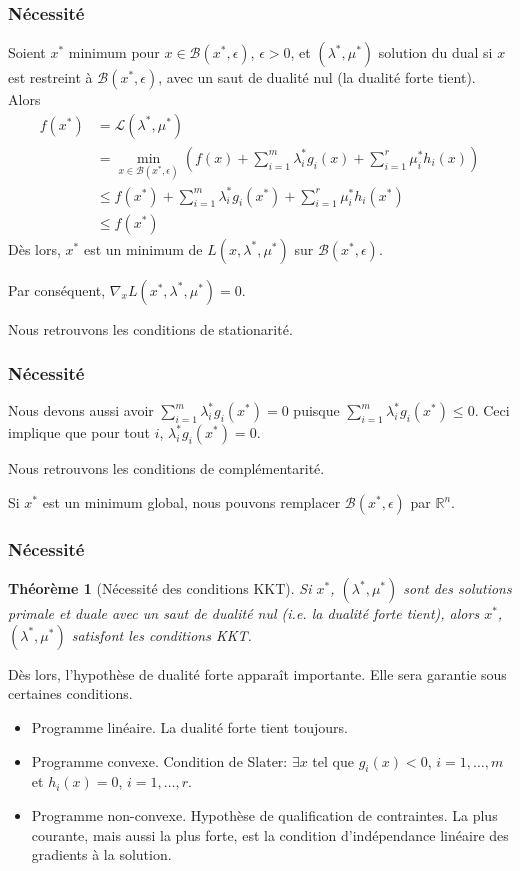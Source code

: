 \documentclass[usepdftitle=false,aspectratio=169]{beamer}
\newtheorem{thm}{Théorème}
\def\cB{\mathcal{B}}
\def\cL{\mathcal{L}}
\def\RR{\mathbb{R}}
\begin{document}
\begin{frame}
\frametitle{Nécessité}

Soient $x^*$ minimum pour $x \in \cB(x^*,\epsilon)$, $\epsilon > 0$, et $(\lambda^*, \mu^*)$ solution du dual si $x$ est restreint à $\cB(x^*,\epsilon)$, avec un saut de dualité nul (la dualité forte tient).
Alors
\begin{align*}
f(x^*) &= \cL(\lambda^*, \mu^*) \\
&= \min_{x \in \cB(x^*,\epsilon)} \left( f(x) + \sum_{i = 1}^m \lambda_i^* g_i(x) + \sum_{i = 1}^r \mu_i^* h_i(x) \right) \\
& \leq f(x^*) + \sum_{i = 1}^m \lambda_i^* g_i(x^*) + \sum_{i = 1}^r \mu_i^* h_i(x^*) \\
& \leq f(x^*)
\end{align*}
Dès lors, $x^*$ est un minimum de $L(x, \lambda^*, \mu^*)$ sur $\cB(x^*,\epsilon)$.

Par conséquent, $\nabla_x L(x^*, \lambda^*, \mu^*) = 0$.

Nous retrouvons les conditions de stationarité.

\end{frame}

\begin{frame}
\frametitle{Nécessité}

Nous devons aussi avoir $\sum_{i = 1}^m \lambda_i^* g_i(x^*) = 0$ puisque $\sum_{i = 1}^m \lambda_i^* g_i(x^*) \leq 0$.
Ceci implique que pour tout $i$, $\lambda_i^* g_i(x^*) = 0$.

\mbox{}

Nous retrouvons les conditions de complémentarité.

\mbox{}

Si $x^*$ est un minimum global, nous pouvons remplacer $\cB(x^*,\epsilon)$ par $\RR^n$.

\end{frame}

\begin{frame}
\frametitle{Nécessité}

\begin{thm}[Nécessité des conditions KKT]
Si $x^*$, $(\lambda^*, \mu^*)$ sont des solutions primale et duale avec un saut de dualité nul (i.e. la dualité forte tient),
alors $x^*$, $(\lambda^*, \mu^*)$ satisfont les conditions KKT.
\end{thm}

\mbox{}

Dès lors, l'hypothèse de dualité forte apparaît importante. Elle sera garantie sous certaines conditions.
\begin{itemize}
\item
Programme linéaire. La dualité forte tient toujours.
\item
Programme convexe. Condition de Slater: $\exists x$ tel que $g_i(x) < 0$, $i = 1,\ldots,m$ et $h_i(x) = 0$, $i = 1,\ldots,r$.
\item
Programme non-convexe.
Hypothèse de qualification de contraintes.
La plus courante, mais aussi la plus forte, est la condition d'indépendance linéaire des gradients à la solution.
\end{itemize}

\end{frame}
\end{document}

